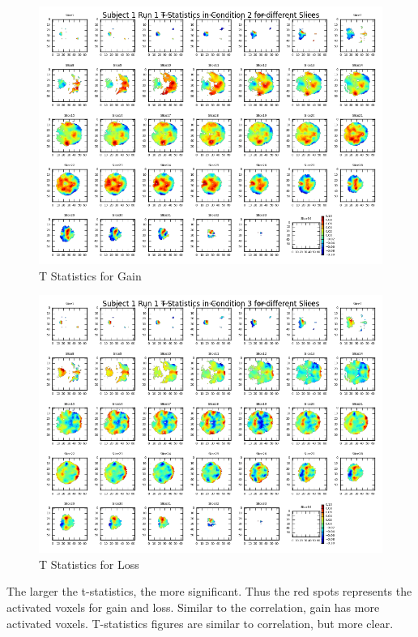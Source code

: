 \begin{figure}[H]
    \centering
        \includegraphics[scale=0.5]{../plots/t_statistics_for_condition_2.png	}
    \caption{T Statistics for Gain}
\end{figure}


\begin{figure}[H]
    \centering
        \includegraphics[scale=0.5]{../plots/t_statistics_for_condition_3.png	}
    \caption{T Statistics for Loss}
\end{figure}

\noindent
The larger the t-statistics, the more significant. Thus the red spots represents the activated voxels for gain and loss. Similar to the correlation,  gain has more activated voxels. T-statistics figures are similar to correlation, but more clear.





